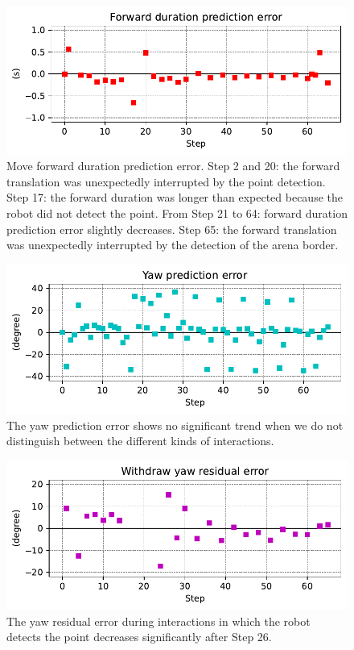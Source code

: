 \documentclass[runningheads]{llncs}
\begin{document}
\begin{figure}
	\includegraphics[width=\textwidth]{07_Forward_duration_pe.pdf}
	\caption{Move forward duration prediction error.
	Step 2 and 20: the forward translation was unexpectedly interrupted by the point detection.
	Step 17: the forward duration was longer than expected because the robot did not detect the point.
	From Step 21 to 64: forward duration prediction error slightly decreases. 
	Step 65: the forward translation was unexpectedly interrupted by the detection of the arena border.} \label{fig:yaw_re}
\end{figure}


\begin{figure}
	\includegraphics[width=\textwidth]{02_yaw_pe.pdf}
	\caption{The yaw prediction error shows no significant trend when we do not distinguish between the different kinds of interactions.} \label{fig:yaw_pe}
\end{figure}

\begin{figure}
	\includegraphics[width=\textwidth]{03_yaw_re.pdf}
	\caption{The yaw residual error during interactions in which the robot detects the point decreases significantly after Step 26.} \label{fig:yaw_re}
\end{figure}
\end{document}
